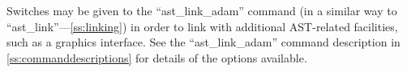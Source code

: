 \documentclass[twoside,11pt]{article}
\newcommand{\htmlref}[2]{#1}
\newcommand{\appref}[1]{Appendix~\ref{#1}}
\newcommand{\secref}[1]{\S\ref{#1}}
\renewcommand{\appref}[1]{\ref{#1}}
\renewcommand{\secref}[1]{\ref{#1}}
\begin{document}
Switches may be given to the ``ast\_link\_adam'' command (in a similar
way to ``\htmlref{ast\_link}{ast_link}''---\secref{ss:linking}) in order to link with
additional AST-related facilities, such as a graphics interface. See
the ``ast\_link\_adam'' command description in
\appref{ss:commanddescriptions} for details of the options available.

\appendix










\newlength{\sstbannerlength}
\newlength{\sstcaptionlength}
\newlength{\sstexampleslength}
\newlength{\sstexampleswidth}

\end{document}
